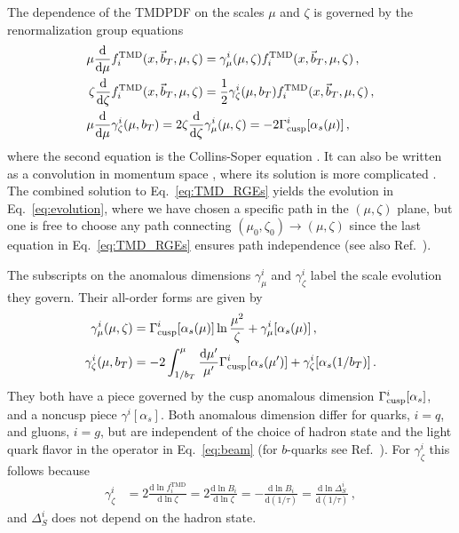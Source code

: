 \documentclass[prd,aps,twocolumn,bibnotes,nofootinbib,preprintnumbers,floatfix]{revtex4-1}
\DeclareRobustCommand{\eq}[1]{Eq.~\eqref{eq:#1}}
\DeclareRobustCommand{\mycite}[1]{Ref.~\cite{#1}}
\newcommand{\df}{\mathrm{d}}
\newcommand{\nn}{\nonumber}
\newcommand{\as}{\alpha_s}
\newcommand{\bt}{\vec b_T}
\newcommand{\GammaC}{\Gamma_{\rm cusp}}
\newcommand\TMD{\mathrm{TMD}}
\begin{document}
The dependence of the TMDPDF on the scales $\mu$ and $\zeta$ is governed by the renormalization group equations
\begin{align} \label{eq:TMD_RGEs}
 \mu \frac{\df}{\df \mu} &f^\TMD_i(x, \bt, \mu, \zeta) = \gamma_\mu^i(\mu,\zeta) f^\TMD_i(x, \bt, \mu, \zeta)
\,,\nn\\
 \zeta \frac{\df}{\df \zeta} &f^\TMD_i(x, \bt, \mu, \zeta) = \frac12 \gamma_\zeta^i(\mu, b_T) f^\TMD_i(x, \bt, \mu, \zeta)
\,,\nn\\
 \mu \frac{\df}{\df\mu} &\gamma_\zeta^i(\mu,b_T) = 2 \zeta \frac{\df}{\df\zeta} \gamma_\mu^i(\mu,\zeta) = - 2\GammaC^i[\as(\mu)]
\,,\end{align}
where the second equation is the Collins-Soper equation \cite{Collins:1981va,Collins:1981uk}.
It can also be written as a convolution in momentum space \cite{Collins:1981va}, where its solution is more complicated \cite{Ebert:2016gcn}.
The combined solution to \eq{TMD_RGEs} yields the evolution in \eq{evolution}, where we have chosen a specific path in the $(\mu,\zeta)$ plane, but one is free to choose any path connecting $(\mu_0,\zeta_0)\to(\mu,\zeta)$ since the last equation in \eq{TMD_RGEs} ensures path independence (see also \mycite{Scimemi:2018xaf}).

The subscripts on the anomalous dimensions $\gamma_\mu^i$ and $\gamma_\zeta^i$ label the scale evolution they govern.
Their all-order forms are given by
\begin{align} \label{eq:anom_dims}
 \gamma_\mu^i(\mu,\zeta) &= \GammaC^i[\as(\mu)] \ln\frac{\mu^2}{\zeta} + \gamma_\mu^i[\as(\mu)]
\,,\\\nn
 \gamma_\zeta^i(\mu,b_T) &= -2 \int_{1/b_T}^\mu \frac{\df\mu'}{\mu'} \GammaC^i[\as(\mu')] + \gamma_\zeta^i[\as(1/b_T)]
\,.\end{align}
They both have a piece governed by the cusp anomalous dimension $\GammaC^i[\as]$, and a noncusp piece $\gamma^i[\as]$.
Both anomalous dimension differ for quarks, $i=q$, and gluons, $i=g$, but are independent of the choice of hadron state and the light quark flavor in the operator in \eq{beam} (for $b$-quarks see \mycite{Pietrulewicz:2017gxc}).
For $\gamma_\zeta^i$ this follows because 
\begin{align}
\gamma_\zeta^i &= 2 \frac{\df\ln f_i^\TMD}{\df\ln \zeta}  = 2 \frac{\df\ln B_i }{\df\ln \zeta} 
= - \frac{\df\ln B_i}{\df (1/\tau)}  =   \frac{\df \ln \Delta_S^i}{\df (1/\tau)} \,,
\end{align} 
and $\Delta_S^i$ does not depend on the hadron state. 
\end{document}
